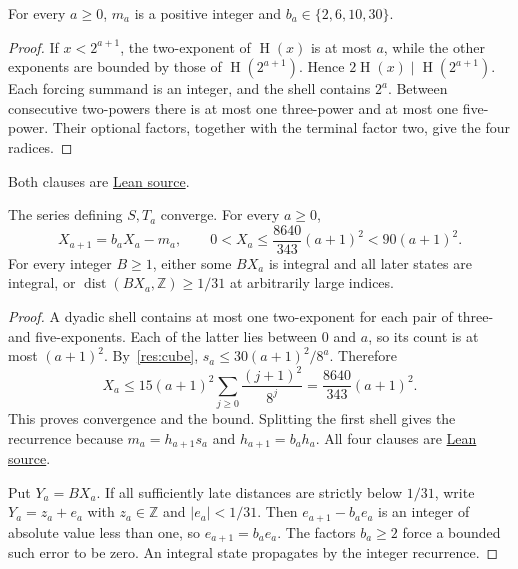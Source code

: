 \documentclass[11pt]{article}
\newcommand{\hgt}{\operatorname{H}}
\begin{document}
\begin{lemma}
\label{res:dyadic-alphabet}
For every $a\ge0$, $m_a$ is a positive integer and
$b_a\in\{2,6,10,30\}$.
\end{lemma}
\begin{proof}
If $x<2^{a+1}$, the two-exponent of $\hgt(x)$ is at most $a$, while the
other exponents are bounded by those of $\hgt(2^{a+1})$.  Hence
$2\hgt(x)\mid\hgt(2^{a+1})$.  Each forcing summand is an integer,
and the shell contains $2^a$.  Between consecutive two-powers there is at
most one three-power and at most one five-power.  Their optional factors,
together with the terminal factor two, give the four radices.
\end{proof}

\noindent Both clauses are \href{https://github.com/wcook04/plectis-erdos/blob/f36a98bf3d3e6f65f1074e3b800e3293d5b8a51a/ErdosProblems/Erdos269/PaperR7ActualOrbit.lean#L48}{Lean source}.

\begin{proposition}
\label{res:actual-orbit}
The series defining $S,T_a$ converge.  For every $a\ge0$,
\[
 X_{a+1}=b_aX_a-m_a,\qquad
 0<X_a\le\frac{8640}{343}(a+1)^2<90(a+1)^2.
\]
For every integer $B\ge1$, either some $BX_a$ is integral and all later
states are integral, or $\operatorname{dist}(BX_a,\mathbb Z)\ge1/31$
at arbitrarily large indices.
\end{proposition}
\begin{proof}
A dyadic shell contains at most one two-exponent for each pair of three-
and five-exponents.  Each of the latter lies between $0$ and $a$, so its
count is at most $(a+1)^2$.  By~\eqref{res:cube},
$s_a\le30(a+1)^2/8^a$.  Therefore
\[
 X_a\le15(a+1)^2\sum_{j\ge0}\frac{(j+1)^2}{8^j}
      =\frac{8640}{343}(a+1)^2.
\]
This proves convergence and the bound.  Splitting the first shell gives
the recurrence because $m_a=h_{a+1}s_a$ and $h_{a+1}=b_ah_a$.
All four clauses are \href{https://github.com/wcook04/plectis-erdos/blob/f36a98bf3d3e6f65f1074e3b800e3293d5b8a51a/ErdosProblems/Erdos269/PaperR7SeriesIdentification.lean#L168}{Lean source}.

Put $Y_a=BX_a$.  If all sufficiently late distances are strictly below
$1/31$, write $Y_a=z_a+e_a$ with $z_a\in\mathbb Z$ and $|e_a|<1/31$.
Then $e_{a+1}-b_ae_a$ is an integer of absolute value less than one, so
$e_{a+1}=b_ae_a$.  The factors $b_a\ge2$ force a bounded such error to be
zero.  An integral state propagates by the integer recurrence.
\end{proof}
\end{document}
